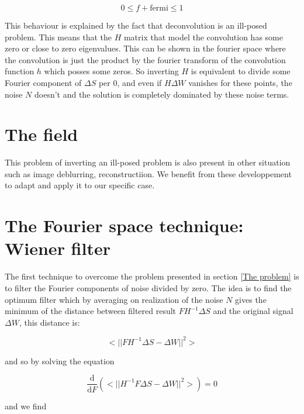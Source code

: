 \documentclass[english]{article}
\begin{document}
\begin{equation}
0 \leq f+\mathrm{fermi} \leq 1
\end{equation}

This behaviour is explained by the fact that deconvolution is an ill-posed problem. This means that the $H$ matrix that model the convolution has some zero or close to zero eigenvalues. This can be shown in the fourier space where the convolution is just the product by the fourier transform of the convolution function $h$ which posses some zeros. So inverting $H$ is equivalent to divide some Fourier component of $\Delta S$ per 0, and even if $H\Delta W$ vanishes for these points, the noise $N$ doesn't and the solution is completely dominated by these noise terms.

\section{The field}


This problem of inverting an ill-posed problem is also present in other situation such as image deblurring, reconstructiion. We benefit from these developpement to adapt and apply it to our specific case.

\section{The Fourier space technique: Wiener filter}


The first technique to overcome the problem presented in section \ref{The problem} is to filter the Fourier components of noise divided by zero. The idea is to find the optimum filter which by averaging on realization of the noise $N$ gives the minimum of the distance between filtered result $FH^{-1}\Delta S$ and the original signal $\Delta W$, this distance is:

\begin{equation}
<|| FH^{-1}\Delta S - \Delta W ||^{2}>
\end{equation}

and so by solving the equation

\begin{equation}
\frac{\mathrm{d}}{\mathrm{d}F}\left( <|| H^{-1}F\Delta S - \Delta W ||^{2}> \right) = 0
\end{equation}

and we find
\end{document}
